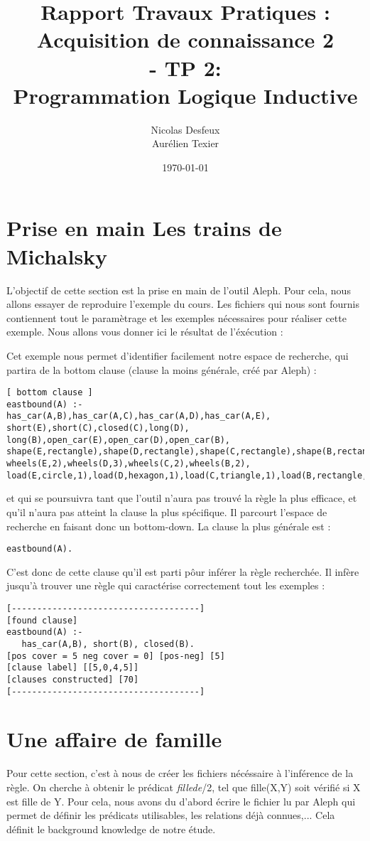 \documentclass[11pt]{article} %
\date{\today}
\title{Rapport Travaux Pratiques : \\Acquisition de connaissance 2\\ - TP 2: \\Programmation Logique Inductive}
\author{Nicolas Desfeux\\Aurélien Texier}
\begin{document}
\lstset{language=Prolog,breaklines=true,numbers=left,basicstyle=\footnotesize ,numberstyle=\footnotesize}
\maketitle
\tableofcontents
\newpage
\section{Prise en main  Les trains de Michalsky}
L'objectif de cette section est la prise en main de l'outil Aleph. Pour cela, nous allons essayer de reproduire l'exemple du cours. Les fichiers qui nous sont fournis contiennent tout le paramètrage et les exemples nécessaires pour réaliser cette exemple. Nous allons vous donner ici le résultat de l'éxécution : 

Cet exemple nous permet d'identifier facilement notre espace de recherche, qui partira de la bottom clause (clause la moins générale, créé par Aleph) : 
\begin{lstlisting}
[ bottom clause ]
eastbound(A) :-
has_car(A,B),has_car(A,C),has_car(A,D),has_car(A,E),
short(E),short(C),closed(C),long(D),
long(B),open_car(E),open_car(D),open_car(B),
shape(E,rectangle),shape(D,rectangle),shape(C,rectangle),shape(B,rectangle),
wheels(E,2),wheels(D,3),wheels(C,2),wheels(B,2),
load(E,circle,1),load(D,hexagon,1),load(C,triangle,1),load(B,rectangle,3).
\end{lstlisting}
et qui se poursuivra tant que l'outil n'aura pas trouvé la règle la plus efficace, et qu'il n'aura pas atteint la clause la plus spécifique. Il parcourt l'espace de recherche en faisant donc un bottom-down.
La clause la plus générale est : 
\begin{lstlisting}
eastbound(A).
\end{lstlisting}
C'est donc de cette clause qu'il est parti pôur inférer la règle recherchée. Il infère jusqu'à trouver une règle qui caractérise correctement tout les exemples : 
\begin{lstlisting}
[-------------------------------------]
[found clause]
eastbound(A) :-
   has_car(A,B), short(B), closed(B).
[pos cover = 5 neg cover = 0] [pos-neg] [5]
[clause label] [[5,0,4,5]]
[clauses constructed] [70]
[-------------------------------------]
\end{lstlisting}

\section{Une affaire de famille}
Pour cette section, c'est à nous de créer les fichiers nécéssaire à l'inférence de la règle. On cherche à obtenir le prédicat \textit{fillede}/2, tel que fille(X,Y) soit vérifié si X est fille de Y.
Pour cela, nous avons du d'abord écrire le fichier lu par Aleph qui permet de définir les prédicats utilisables, les relations déjà connues,... Cela définit le background knowledge de notre étude.

\end{document}
